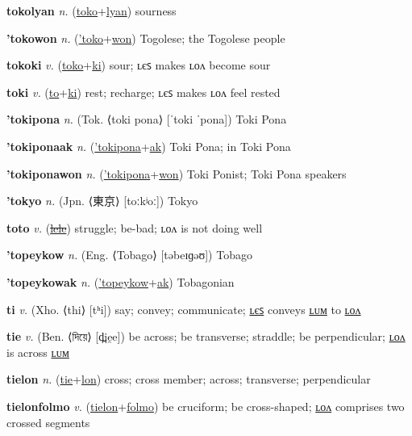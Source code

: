 \textbf{\hypertarget{tokolyan}{tokolyan}} \textit{n.} (\hyperlink{toko}{toko}+\allowbreak \hyperlink{lyan}{lyan})
sourness

\textbf{\hypertarget{'tokowon}{'tokowon}} \textit{n.} (\hyperlink{'toko}{'toko}+\allowbreak \hyperlink{won}{won})
Togolese; the Togolese people

\textbf{\hypertarget{tokoki}{tokoki}} \textit{v.} (\hyperlink{toko}{toko}+\allowbreak \hyperlink{ki}{ki})
sour; ʟєꜱ makes ʟᴏᴧ become sour

\textbf{\hypertarget{toki}{toki}} \textit{v.} (\hyperlink{to}{to}+\allowbreak \hyperlink{ki}{ki})
rest; recharge; ʟєꜱ makes ʟᴏᴧ feel rested

\textbf{\hypertarget{'tokipona}{'tokipona}} \textit{n.} (Tok. ⟨toki pona⟩ [ˈtoki ˈpona])
Toki Pona

\textbf{\hypertarget{'tokiponaak}{'tokiponaak}} \textit{n.} (\hyperlink{'tokipona}{'tokipona}+\allowbreak \hyperlink{ak}{ak})
Toki Pona; in Toki Pona

\textbf{\hypertarget{'tokiponawon}{'tokiponawon}} \textit{n.} (\hyperlink{'tokipona}{'tokipona}+\allowbreak \hyperlink{won}{won})
Toki Ponist; Toki Pona speakers

\textbf{\hypertarget{'tokyo}{'tokyo}} \textit{n.} (Jpn. ⟨{\japanese{}東京}⟩ [toːkʲoː])
Tokyo

\textbf{\hypertarget{toto}{toto}} \textit{v.} (\hyperlink{lele}{\sout{lele}})
struggle; be-bad; ʟᴏᴧ is not doing well

\textbf{\hypertarget{'topeykow}{'topeykow}} \textit{n.} (Eng. ⟨Tobago⟩ [təbeɪɡəʊ])
Tobago

\textbf{\hypertarget{'topeykowak}{'topeykowak}} \textit{n.} (\hyperlink{'topeykow}{'topeykow}+\allowbreak \hyperlink{ak}{ak})
Tobagonian

\textbf{\hypertarget{ti}{ti}} \textit{v.} (Xho. ⟨thi⟩ [tʰi])
say; convey; communicate; \hyperlink{tiles}{ʟєꜱ} conveys \hyperlink{tilum}{ʟᴜᴍ} to \hyperlink{tilon}{ʟᴏᴧ}

\textbf{\hypertarget{tie}{tie}} \textit{v.} (Ben. ⟨{\bengali{}দিয়ে}⟩ [d̪ie̯e])
be across; be transverse; straddle; be perpendicular; \hyperlink{tielon}{ʟᴏᴧ} is across \hyperlink{tielum}{ʟᴜᴍ}

\textbf{\hypertarget{tielon}{tielon}} \textit{n.} (\hyperlink{tie}{tie}+\allowbreak \hyperlink{lon}{lon})
cross; cross member; across; transverse; perpendicular

\textbf{\hypertarget{tielonfolmo}{tielonfolmo}} \textit{v.} (\hyperlink{tielon}{tielon}+\allowbreak \hyperlink{folmo}{folmo})
be cruciform; be cross-shaped; \hyperlink{tielonfolmolon}{ʟᴏᴧ} comprises two crossed segments

